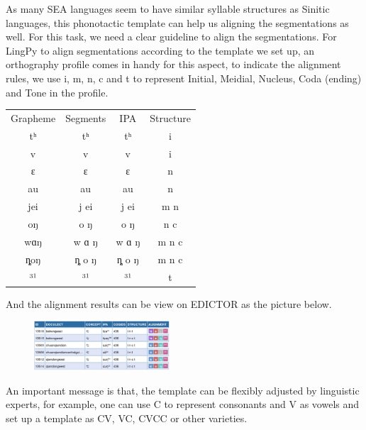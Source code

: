 \documentclass[xetex,svgnames]{scrartcl}
\begin{document}
As many SEA languages seem to have similar syllable structures as Sinitic languages, this phonotactic template can help us aligning the segmentations as well. For this task, we need a clear guideline to align the segmentations. For LingPy to align segmentations according to the template we set up, an orthography profile comes in handy for this aspect, to indicate the alignment rules, we use i, m, n, c and t to represent Initial, Meidial, Nucleus, Coda (ending) and Tone in the profile. 

\begin{table}
\begin{tabular}{cccc}
Grapheme & Segments & IPA & Structure \\
tʰ & tʰ & tʰ & i \\
v & v & v & i \\
ɛ & ɛ & ɛ & n \\
au & au & au & n\\
jei & j ei & j ei & m n \\
oŋ & o ŋ & o ŋ & n c \\
wɑŋ & w ɑ ŋ & w ɑ ŋ & m n c \\
ȵoŋ & ȵ o ŋ & ȵ o ŋ & m n c \\
³¹ & ³¹	& ³¹ & t \\
\end{tabular}
\label{An example of orthography profile for template alignment.}
\end{table}

And the alignment results can be view on EDICTOR as the picture below.
\begin{figure}[htb]
\includegraphics[width=0.45\textwidth]{template-alignment.png}
\end{figure} 

An important message is that, the template can be flexibly adjusted by linguistic experts, for example, one can use C to represent consonants and V as vowels and set up a template as CV, VC, CVCC or other varieties. 
\end{document}
